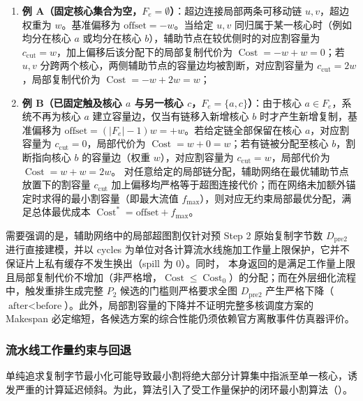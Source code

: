 \documentclass[anonymous,withtoc]{gmcm2026}
\providecommand{\tightlist}{\setlength{\itemsep}{0pt}\setlength{\parskip}{0pt}}
\begin{document}
\begin{enumerate}
\def\labelenumi{\arabic{enumi}.}
\tightlist
\item
  \textbf{例 A（固定核心集合为空，\(F_e = \emptyset\)）}：超边连接局部两条可移动链 \(u, v\)，超边权重为 \(w\)。基准偏移为 \(\text{offset} = -w\)。当给定 \(u, v\) 同归属于某一核心时（例如均分在核心 \(a\) 或均分在核心 \(b\)），辅助节点在较优侧时的对应割容量为 \(c_{\mathrm{cut}} = w\)，加上偏移后该分配下的局部复制代价为 \(\operatorname{Cost} = -w + w = 0\)；若 \(u, v\) 分跨两个核心，两侧辅助节点的容量边均被割断，对应割容量为 \(c_{\mathrm{cut}} = 2w\)，局部复制代价为 \(\operatorname{Cost} = -w + 2w = w\)；
\item
  \textbf{例 B（已固定触及核心 \(a\) 与另一核心 \(c\)，\(F_e = \{a, c\}\)）}：由于核心 \(a \in F_e\)，系统不再为核心 \(a\) 建立容量边，仅当有链移入新增核心 \(b\) 时才产生新增复制，基准偏移为 \(\text{offset} = (|F_e| - 1)w = +w\)。若给定链全部保留在核心 \(a\)，对应割容量为 \(c_{\mathrm{cut}} = 0\)，局部代价为 \(\operatorname{Cost} = w + 0 = w\)；若有链被分配至核心 \(b\)，割断指向核心 \(b\) 的容量边（权重 \(w\)），对应割容量为 \(c_{\mathrm{cut}} = w\)，局部代价为 \(\operatorname{Cost} = w + w = 2w\)。 对任意给定的局部链分配，辅助网络在最优辅助节点放置下的割容量 \(c_{\mathrm{cut}}\) 加上偏移均严格等于超图连接代价；而在网络未加额外锚定时求得的最小割容量（即最大流值 \(f_{\max}\)），则对应无约束局部最优分配，满足总体最优成本 \(\operatorname{Cost}^* = \text{offset} + f_{\max}\)。
\end{enumerate}

需要强调的是，辅助网络中的局部超图割仅针对预 Step 2 原始复制字节数 \(D_{\mathrm{pre2}}\) 进行直接建模，并以 cycles 为单位对各计算流水线施加工作量上限保护，它并不保证片上私有缓存不发生换出（spill 为 0）。同时，\texttt{} 本身返回的是满足工作量上限且局部复制代价不增加（非严格增，\(\operatorname{Cost} \le \operatorname{Cost}_0\)）的分配；而在外层细化流程 \texttt{} 中，触发重排生成完整 \(P_2\) 候选的门槛则严格要求全图 \(D_{\mathrm{pre2}}\) 产生严格下降（\(\text{after} < \text{before}\)）。此外，局部割容量的下降并不证明完整多核调度方案的 Makespan 必定缩短，各候选方案的综合性能仍须依赖官方离散事件仿真器评价。

\subsubsection{流水线工作量约束与回退}

单纯追求复制字节最小化可能导致最小割将绝大部分计算集中指派至单一核心，诱发严重的计算延迟倾斜。为此，算法引入了受工作量保护的闭环最小割算法（\texttt{}）。
\end{document}
